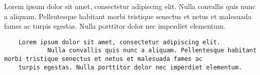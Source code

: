 \documentclass{book}
\begin{document}
\begin{something}
Lorem ipsum dolor sit amet, consectetur adipiscing elit. 
Nulla convallis quis nunc a aliquam. Pellentesque habitant 
morbi tristique senectus et netus et malesuada fames ac 
turpis egestas. Nulla porttitor dolor nec imperdiet elementum. 
\end{something}

\begin{verbatim}
    Lorem ipsum dolor sit amet, consectetur adipiscing elit. 
            Nulla convallis quis nunc a aliquam. Pellentesque habitant 
morbi tristique senectus et netus et malesuada fames ac 
    turpis egestas. Nulla porttitor dolor nec imperdiet elementum. 
\end{verbatim}
\end{document}

